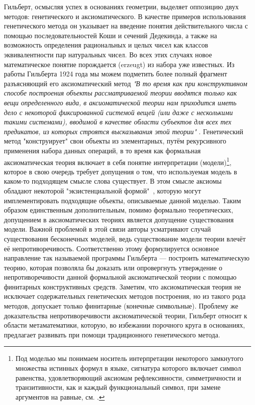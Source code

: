 \documentclass[14pt]{extarticle}
\begin{document}
	Гильберт, осмысляя успех в основаниях геометрии, выделяет оппозицию двух методов: генетического и аксиоматического. В качестве примеров использования генетического метода он указывает на введение понятия действительного числа с помощью последовательностей Коши и сечений Дедекинда, а также на возможность определения рациональных и целых чисел как классов эквивалентности пар натуральных чисел. Во всех этих случаях новое математическое понятие порождается (erzeugt) из набора уже известных. Из работы Гильберта 1924 года мы можем подметить более полный фрагмент разъясняющий  его аксиоматический метод \textit{"В то время как при конструктивном способе построения объекты рассматриваемой теории вводятся только как вещи определенного вида, в аксиоматической теории нам приходится иметь дело с некоторой фиксированной системой вещей (или даже с несколькими такими системами), вводимой в качестве области субъектов для всех тех предикатов, из которых строятся высказывания этой теории"} \cite[24]{GilbertBernays}. Генетический метод "конструирует" свои объекты из элементарных, путём рекурсивного применения набора данных операций, в то время как формальная аксиоматическая теория включает в себя понятие интерпретации (модели)\footnote{Под моделью мы понимаем носитель интерпретации некоторого замкнутого множества истинных формул в языке, сигнатура которого включает символ равенства, удовлетворяющий аксиомам рефлексивности, симметричности и транзитивности, как и каждый функциональный символ, при замене аргументов на равные, см. \cite[174]{VereshchaginShen}.}, которое в свою очередь требует допущения о том, что используемая модель в каком-то подходящем смысле слова существует. В этом смысле аксиомы обладают некоторой "экзистенциальной формой"\  , которую могут имплементировать подходящие объекты, описываемые данной моделью. Таким образом единственным дополнительным, помимо формально теоретических, допущением в аксиоматических теориях является допущение существования модели. Важной проблемой в этой связи авторы усматривают случай существования бесконечных моделей, ведь существование модели теории влечёт её непротиворечивость. Соответственно этому формулируется основное направление  так называемой программы Гильберта — построить математическую теорию, которая позволяла бы доказать или опровергнуть утверждение о непротиворечивости данной формальной аксиоматической теории с помощью финитарных конструктивных средств. Заметим, что аксиоматическая теория не исключает содержательных генетических методов построения, но из такого рода методов, допускает только финитарные (конечные символьные). Проблему же доказательства непротиворечивости аксиоматической теории, Гильберт относит к области метаматематики, которую, во избежании порочного круга в основаниях, предлагает развивать при помощи традиционного генетического метода. 
	
\end{document}
